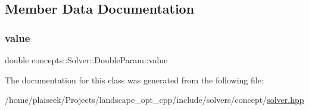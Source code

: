 \subsection{Member Data Documentation}
\mbox{\label{classconcepts_1_1_solver_1_1_double_param_af41548e144e9d6e09188c969740d3507}} 
\subsubsection{\texorpdfstring{value}{value}}
{\footnotesize\ttfamily double concepts\+::\+Solver\+::\+Double\+Param\+::value\hspace{0.3cm}{\ttfamily [protected]}}



The documentation for this class was generated from the following file\+:\begin{DoxyCompactItemize}
\item 
/home/plaiseek/\+Projects/landscape\+\_\+opt\+\_\+cpp/include/solvers/concept/\hyperlink{solver_8hpp}{solver.\+hpp}\end{DoxyCompactItemize}
